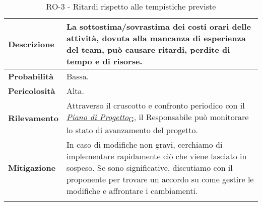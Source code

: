 \begin{longtable}{ | l | p{12cm} | }
	\hline
	\textbf{Descrizione}  & La sottostima/sovrastima dei costi orari delle attività, dovuta alla mancanza di esperienza del team, può causare ritardi, perdite di tempo e di risorse.                                                                                                          \\
	\hline
	\textbf{Probabilità}  & Bassa.                                                                                                                                                                                                                                                             \\
	\hline
	\textbf{Pericolosità} & Alta.                                                                                                                                                                                                                                                              \\
	\hline
	\textbf{Rilevamento}  & Attraverso il cruscotto e confronto periodico con il \href{https://7last.github.io/docs/rtb/documentazione-interna/glossario#piano-di-progetto}{\textit{Piano di Progetto}\textsubscript{G}}, il Responsabile può monitorare lo stato di avanzamento del progetto. \\
	\hline
	\textbf{Mitigazione}  & In caso di modifiche non gravi, cerchiamo di implementare rapidamente ciò che viene lasciato in sospeso. Se sono significative, discutiamo con il proponente per trovare un accordo su come gestire le modifiche e affrontare i cambiamenti.                       \\
	\hline
	\caption{RO-3 - Ritardi rispetto alle tempistiche previste}
	\label{table:3}
\end{longtable}

\newpage


